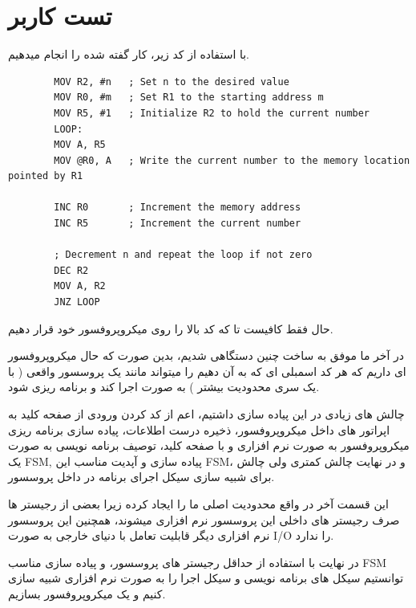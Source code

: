 \documentclass[11pt]{article}
\begin{document}
\clearpage

\section{تست کاربر}

با استفاده از کد زیر، کار گفته شده را انجام میدهیم.
\begin{latin}
	\begin{verbatim}
		MOV R2, #n   ; Set n to the desired value
		MOV R0, #m   ; Set R1 to the starting address m
		MOV R5, #1   ; Initialize R2 to hold the current number
		LOOP:
		MOV A, R5
		MOV @R0, A   ; Write the current number to the memory location pointed by R1
		
		INC R0       ; Increment the memory address
		INC R5       ; Increment the current number
		
		; Decrement n and repeat the loop if not zero
		DEC R2
		MOV A, R2    
		JNZ LOOP
	\end{verbatim}
\end{latin}

حال فقط کافیست تا که کد بالا را روی میکروپروفسور خود قرار دهیم.

\vfil 

\begin{conclusion}
	در آخر ما موفق به ساخت چنین دستگاهی شدیم، بدین صورت که حال میکروپروفسور ای 
	داریم که هر کد اسمبلی ای که به آن دهیم را میتواند مانند یک پروسسور واقعی ( با یک سری محدودیت بیشتر )
	به صورت  اجرا کند و برنامه ریزی شود.

	چالش های زیادی در این پیاده سازی داشتیم، اعم از 
	کد کردن ورودی از صفحه کلید به اپراتور های داخل میکروپروفسور، 
	ذخیره درست اطلاعات، پیاده سازی برنامه ریزی میکروپروفسور به صورت نرم افزاری و با صفحه کلید، توصیف 
	برنامه نویسی به صورت یک FSM, پیاده سازی و آپدیت مناسب این FSM، 
	و در نهایت چالش کمتری ولی چالش برای شبیه سازی سیکل اجرای برنامه در داخل پروسسور.

	این قسمت آخر در واقع محدودیت اصلی ما را ایجاد کرده زیرا بعضی از رجیستر ها 
	صرف رجیستر های داخلی این پروسسور نرم افزاری میشوند، همچنین این پروسسور نرم افزاری 
	دیگر قابلیت تعامل با دنیای خارجی به صورت I/O را ندارد.

	در نهایت با استفاده از حداقل رجیستر های پروسسور، و پیاده سازی مناسب FSM توانستیم 
	سیکل های برنامه نویسی و سیکل اجرا را به صورت نرم افزاری شبیه سازی کنیم و یک 
	میکروپروفسور بسازیم.
\end{conclusion}
\end{document}
